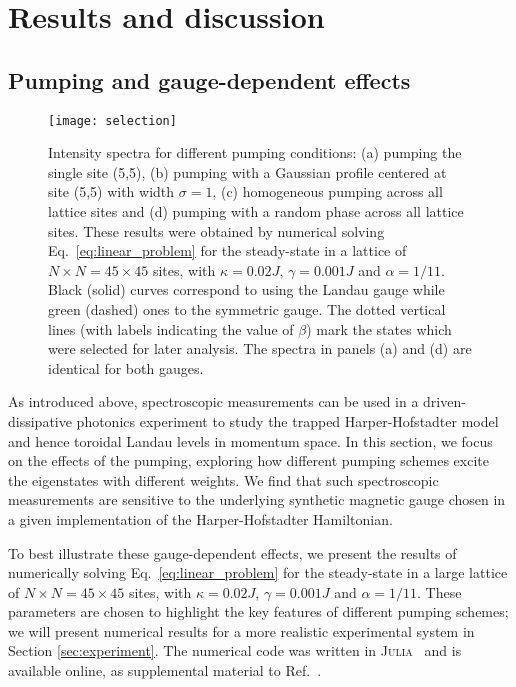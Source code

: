 \section{Results and discussion}
\label{sec:results}

\subsection{Pumping and gauge-dependent effects}
\label{sec:selection}

\begin{figure}[tb]\centering
  \texttt{[image: selection]}
  \caption{Intensity spectra for different pumping conditions: (a)
pumping the single site (5,5), (b) pumping with a Gaussian profile
centered at site (5,5) with width $\sigma=1$, (c) homogeneous pumping
across all lattice sites and (d) pumping with a random phase across
all lattice sites. These results were obtained by numerical solving
Eq.~\eqref{eq:linear_problem} for the steady-state in a lattice of $N
\times N = 45 \times 45$ sites, with $\kappa = 0.02 J$, $\gamma =
0.001 J$ and $\alpha = 1/11$.  Black (solid) curves correspond to
using the Landau gauge while green (dashed) ones to the symmetric
gauge. The dotted vertical lines (with labels indicating the value of
$\beta$) mark the states which were selected for later analysis. The
spectra in panels (a) and (d) are identical for both gauges.}
  \label{fig:pumping_schemes}
\end{figure}

As introduced above, spectroscopic measurements can be used in a
driven-dissipative photonics experiment to study the trapped
Harper-Hofstadter model and hence toroidal Landau levels in momentum
space. In this section, we focus on the effects of the pumping,
exploring how different pumping schemes excite the eigenstates with
different weights. We find that such spectroscopic measurements are
sensitive to the underlying synthetic magnetic gauge chosen in a given
implementation of the Harper-Hofstadter Hamiltonian.

To best illustrate these gauge-dependent effects, we present the
results of numerically solving Eq.~\eqref{eq:linear_problem} for the
steady-state in a large lattice of $N \times N = 45 \times 45$ sites,
with $\kappa = 0.02 J$, $\gamma = 0.001 J$ and $\alpha = 1/11$.  These
parameters are chosen to highlight the key features of different
pumping schemes; we will present numerical results for a more
realistic experimental system in Section \ref{sec:experiment}.  The
numerical code was written in \textsc{Julia}~\cite{bezanson2014julia}
and is available online, as supplemental material to
Ref.~\cite{Berceanu2016}.

